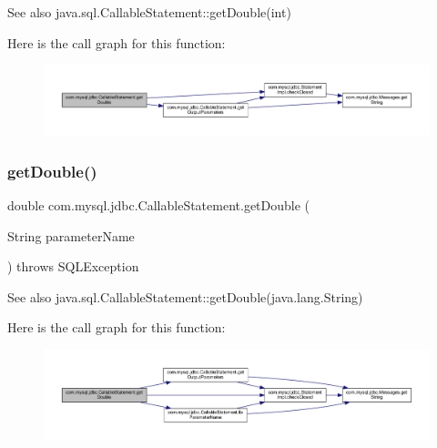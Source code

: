 \begin{DoxySeeAlso}{See also}
java.\+sql.\+Callable\+Statement\+::get\+Double(int) 
\end{DoxySeeAlso}
Here is the call graph for this function\+:\nopagebreak
\begin{figure}[H]
\begin{center}
\leavevmode
\includegraphics[width=350pt]{classcom_1_1mysql_1_1jdbc_1_1_callable_statement_a08f25a1b0d48b0085e418aaf5445ce19_cgraph}
\end{center}
\end{figure}
\mbox{\label{classcom_1_1mysql_1_1jdbc_1_1_callable_statement_ae37344036d51a7e4fa8c2b9fa114a5e3}} 
\subsubsection{\texorpdfstring{get\+Double()}{getDouble()}\hspace{0.1cm}{\footnotesize\ttfamily [2/2]}}
{\footnotesize\ttfamily double com.\+mysql.\+jdbc.\+Callable\+Statement.\+get\+Double (\begin{DoxyParamCaption}\item[{String}]{parameter\+Name }\end{DoxyParamCaption}) throws S\+Q\+L\+Exception}

\begin{DoxySeeAlso}{See also}
java.\+sql.\+Callable\+Statement\+::get\+Double(java.\+lang.\+String) 
\end{DoxySeeAlso}
Here is the call graph for this function\+:\nopagebreak
\begin{figure}[H]
\begin{center}
\leavevmode
\includegraphics[width=350pt]{classcom_1_1mysql_1_1jdbc_1_1_callable_statement_ae37344036d51a7e4fa8c2b9fa114a5e3_cgraph}
\end{center}
\end{figure}
\mbox{\label{classcom_1_1mysql_1_1jdbc_1_1_callable_statement_a8d46288adf1ec4d20ec7b7a81cd94b58}} 
